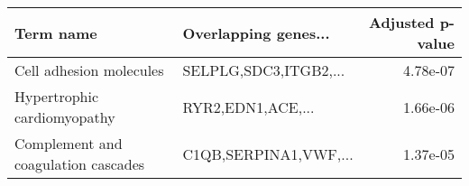 \begin{tabular}{llr}
\toprule
                          Term name &  Overlapping genes... &  Adjusted p-value \\
\midrule
            Cell adhesion molecules & SELPLG,SDC3,ITGB2,... &          4.78e-07 \\
        Hypertrophic cardiomyopathy &     RYR2,EDN1,ACE,... &          1.66e-06 \\
Complement and coagulation cascades & C1QB,SERPINA1,VWF,... &          1.37e-05 \\
\bottomrule
\end{tabular}
